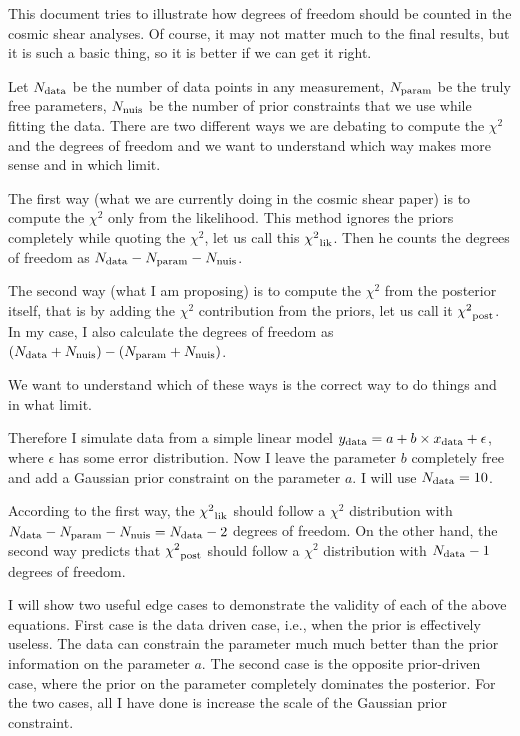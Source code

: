 \documentclass[11pt]{article}
\newcommand{\ndata}{{N_{\rm data}}}
\newcommand{\ydata}{{y_{\rm data}}}
\newcommand{\xdata}{{x_{\rm data}}}
\newcommand{\nparam}{{N_{\rm param}}}
\newcommand{\nnuis}{{N_{\rm nuis}}}
\newcommand{\chisq}{{\chi^{2}}}
\begin{document}
This document tries to illustrate how degrees of freedom should be counted in
the cosmic shear analyses. Of course, it may not matter much to the final
results, but it is such a basic thing, so it is better if we can get it right.

Let $\ndata$ be the number of data points in any measurement, $\nparam$
be the truly free parameters, $\nnuis$ be the number of prior constraints
that we use while fitting the data. There are two different ways we are
debating to compute the $\chisq$ and the degrees of freedom and we want to
understand which way makes more sense and in which limit.

The first way (what we are currently doing in the cosmic shear paper) is to
compute the $\chisq$ only from the likelihood. This method ignores the priors
completely while quoting the $\chisq$, let us call this $\chisq_{\rm lik}$.
Then he counts the degrees of freedom as $\ndata-\nparam-\nnuis$.

The second way (what I am proposing) is to compute the $\chisq$ from the
posterior itself, that is by adding the $\chisq$ contribution from the priors,
let us call it $\chisq_{\rm post}$.  In my case, I also calculate the degrees
of freedom as $(\ndata+\nnuis)-(\nparam+\nnuis)$.

We want to understand which of these ways is the correct way to do things and
in what limit.

Therefore I simulate data from a simple linear model $\ydata=a+b\times
\xdata+\epsilon$, where $\epsilon$ has some error distribution. Now I leave the
parameter $b$ completely free and add a Gaussian prior constraint on the
parameter $a$. I will use $\ndata=10$. 

According to the first way, the $\chisq_{\rm lik}$ should follow a $\chisq$
distribution with $\ndata-\nparam-\nnuis=\ndata-2$ degrees of freedom. On the
other hand, the second way predicts that $\chisq_{\rm post}$ should follow a
$\chisq$ distribution with $\ndata-1$ degrees of freedom.

I will show two useful edge cases to demonstrate the validity of each of the
above equations. First case is the data driven case, i.e., when the prior is
effectively useless. The data can constrain the parameter much much better than
the prior information on the parameter $a$. The second case is the opposite
prior-driven case, where the prior on the parameter completely dominates the
posterior. For the two cases, all I have done is increase the scale of the
Gaussian prior constraint.
\end{document}
